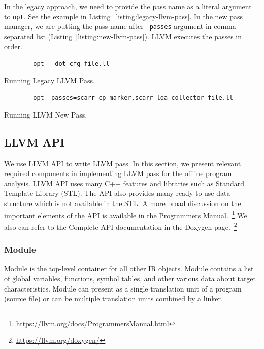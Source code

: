 In the legacy approach, we need to provide the pass name as a literal argument
to \texttt{opt}. See the example in Listing~\ref{listing:legacy-llvm-pass}. In
the new pass manager, we are putting the pass name after \texttt{--passes}
argument in comma-separated list (Listing~\ref{listing:new-llvm-pass}). LLVM
executes the passes in order.

\begin{listing}[h!]
    \begin{verbatim}
        opt --dot-cfg file.ll 
    \end{verbatim}
    \caption{Running Legacy LLVM Pass.}    
    \label{listing:legacy-llvm-pass}
\end{listing}

\begin{listing}[h!]
    \begin{verbatim}
        opt -passes=scarr-cp-marker,scarr-loa-collector file.ll 
    \end{verbatim}
    \caption{Running LLVM New Pass.}    
    \label{listing:new-llvm-pass}
\end{listing}

\subsection{LLVM API}

We use LLVM API to write LLVM pass. In this section, we present relevant
required components in implementing LLVM pass for the offline program analysis.
LLVM API uses many C++ features and libraries such as Standard Template Library
(STL). The API also provides many ready to use data structure which is not
available in the STL. A more broad discussion on the important elements of the
API is available in the Programmers
Manual.~\footnote{\url{https://llvm.org/docs/ProgrammersManual.html}} We also
can refer to the Complete API documentation in the Doxygen
page.~\footnote{\url{https://llvm.org/doxygen/}}

\subsubsection{Module}

Module is the top-level container for all other IR objects. Module contains a
list of global variables, functions, symbol tables, and other various data about
target characteristics. Module can present as a single translation unit of a
program (source file) or can be multiple translation units combined by a linker.


